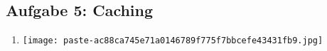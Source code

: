 \documentclass[12pt,a4paper]{article}
\begin{document}
\subsection*{Aufgabe 5: Caching}

\begin{enumerate}[label=\alph*), topsep=5pt, itemsep=10pt]
\item \mbox{}\begin{center}\texttt{[image: paste-ac88ca745e71a0146789f775f7bbcefe43431fb9.jpg]}
\end{center}
\end{enumerate}
\clearpage
\end{document}
